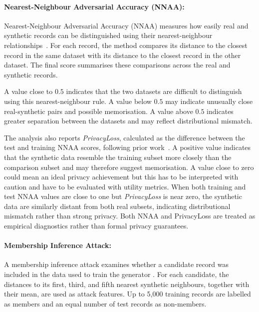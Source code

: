 \paragraph{Nearest-Neighbour Adversarial Accuracy (NNAA):}
\label{sec:eval:privacy:nnaa}

Nearest-Neighbour Adversarial Accuracy (NNAA) measures how easily real
and synthetic records can be distinguished using their
nearest-neighbour relationships~\cite{healthgan}. For each record, the
method compares its distance to the closest record in the same dataset
with its distance to the closest record in the other dataset. The final
score summarises these comparisons across the real and synthetic
records.

A value close to $0.5$ indicates that the two datasets are difficult to
distinguish using this nearest-neighbour rule. A value below $0.5$ may
indicate unusually close real-synthetic pairs and possible
memorisation. A value above $0.5$ indicates greater separation between
the datasets and may reflect distributional mismatch.

The analysis also reports \emph{PrivacyLoss}, calculated as the
difference between the test and training NNAA scores, following prior
work~\cite{healthgan}. A positive value indicates that the synthetic
data resemble the training subset more closely than the comparison
subset and may therefore suggest memorisation. A value close to zero
could mean an ideal privacy achievement but this has to be interpreted
with caution and have to be evaluated with utility metrics. 
When both training and test NNAA values are close to one but
\emph{PrivacyLoss} is near zero, the synthetic data are similarly
distant from both real subsets, indicating distributional mismatch
rather than strong privacy. Both NNAA and
PrivacyLoss are treated as empirical diagnostics rather than formal
privacy guarantees.

\paragraph{Membership Inference Attack:}
\label{sec:eval:privacy:mia}

A membership inference attack examines whether a candidate record was
included in the data used to train the generator
\cite{Shokri2017MIA}. For each candidate, the distances to its first,
third, and fifth nearest synthetic neighbours, together with their mean,
are used as attack features. Up to 5,000 training records are labelled
as members and an equal number of test records as non-members.

